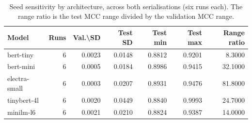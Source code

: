 \begin{table}[htbp]
\centering
\caption{Seed sensitivity by architecture, across both serialisations (six runs each). The range ratio is the test MCC range divided by the validation MCC range.}
\label{tab:variance-by-model}
\small
\begin{tabular}{lrrrrrr}
\toprule
Model & Runs & Val.\textbackslash \space SD & Test SD & Test min & Test max & Range ratio \\
\midrule
bert-tiny & 6 & 0.0023 & 0.0148 & 0.8812 & 0.9201 & 8.3000 \\
bert-mini & 6 & 0.0005 & 0.0184 & 0.8986 & 0.9415 & 32.1000 \\
electra-small & 6 & 0.0003 & 0.0207 & 0.8931 & 0.9476 & 81.8000 \\
tinybert-4l & 6 & 0.0020 & 0.0449 & 0.8840 & 0.9993 & 24.7000 \\
minilm-l6 & 6 & 0.0021 & 0.0210 & 0.8824 & 0.9387 & 14.0000 \\
\bottomrule
\end{tabular}
\end{table}
